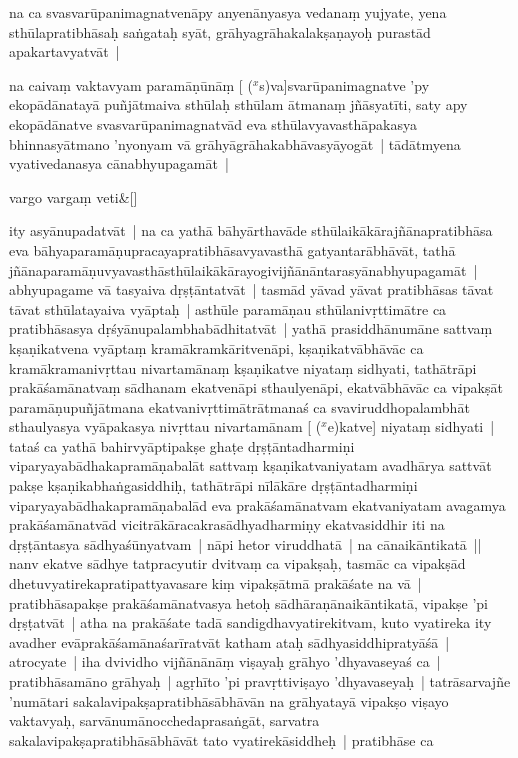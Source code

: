 \documentclass[article,a4paper]{memoir}
\newcommand{\corr}[1]{($^{x}$#1)}
\begin{document}
	  \pstart na ca svasvarū\-panimagnatvenā\-py anyenā\-nyasya vedanaṃ yujyate, yena sthū\-lapratibhā\-saḥ saṅgataḥ syā\-t, grā\-hyagrā\-hakalakṣaṇayoḥ purastā\-d apakartavyatvā\-t |
	\pend
      

	  \pstart na caivaṃ vaktavyam paramā\-ṇū\-nā\-ṃ [ {\corr sva}]svarū\-panimagnatve 'py ekopā\-dā\-natayā\- puñjā\-tmaiva sthū\-laḥ sthū\-lam ā\-tmanaṃ jñā\-syatī\-ti, saty apy ekopā\-dā\-natve svasvarū\-panimagnatvā\-d eva sthū\-lavyavasthā\-pakasya bhinnasyā\-tmano 'nyonyam vā\- grā\-hyā\-grā\-hakabhā\-vasyā\-yogā\-t | tā\-dā\-tmyena vyativedanasya cā\-nabhyupagamā\-t |
	\pend
      
	    
	    \stanza[\smallbreak]
vargo vargaṃ veti\&[\smallbreak]


	

	  \pstart ity asyā\-nupadatvā\-t | na ca yathā\- bā\-hyā\-rthavā\-de sthū\-laikā\-kā\-rajñā\-napratibhā\-sa eva bā\-hyaparamā\-ṇupracayapratibhā\-savyavasthā\- gatyantarā\-bhā\-vā\-t, tathā\- jñā\-naparamā\-ṇuvyavasthā\-[ {\corr 〔nne〕}]sthū\-laikā\-kā\-rayogivijñā\-nā\-ntarasyā\-nabhyupagamā\-t | abhyupagame vā\- tasyaiva dṛṣṭā\-ntatvā\-t | tasmā\-d yā\-vad yā\-vat pratibhā\-sas tā\-vat tā\-vat sthū\-latayaiva vyā\-ptaḥ | asthū\-le paramā\-ṇau sthū\-lanivṛttimā\-tre ca pratibhā\-sasya dṛśyā\-nupalambhabā\-dhitatvā\-t | yathā\- prasiddhā\-numā\-ne sattvaṃ kṣaṇikatvena vyā\-ptaṃ kramā\-kramkā\-ritvenā\-pi, kṣaṇikatvā\-bhā\-vā\-c ca kramā\-kramanivṛttau nivartamā\-naṃ kṣaṇikatve niyataṃ sidhyati, tathā\-trā\-pi prakā\-śamā\-natvaṃ sā\-dhanam ekatvenā\-pi sthaulyenā\-pi, ekatvā\-bhā\-vā\-c ca vipakṣā\-t paramā\-ṇupuñjā\-tmana ekatvanivṛttimā\-trā\-tmanaś ca svaviruddhopalambhā\-t sthaulyasya vyā\-pakasya nivṛttau nivartamā\-nam [ {\corr ekatve}] niyataṃ sidhyati | tataś ca yathā\- bahirvyā\-ptipakṣe ghaṭe dṛṣṭā\-ntadharmiṇi viparyayabā\-dhakapramā\-ṇabalā\-t sattvaṃ kṣaṇikatvaniyatam avadhā\-rya sattvā\-t pakṣe kṣaṇikabhaṅgasiddhiḥ, tathā\-trā\-pi nī\-lā\-kā\-re dṛṣṭā\-ntadharmiṇi viparyayabā\-dhakapramā\-ṇabalā\-d eva prakā\-śamā\-natvam ekatvaniyatam avagamya prakā\-śamā\-natvā\-d vicitrā\-kā\-racakrasā\-dhyadharmiṇy ekatvasiddhir iti na dṛṣṭā\-ntasya sā\-dhyaśū\-nyatvam | nā\-pi hetor viruddhatā\- | na cā\-naikā\-ntikatā\- || \label{thakur75-130.33} nanv ekatve sā\-dhye tatpracyutir dvitvaṃ ca vipakṣaḥ, tasmā\-c ca vipakṣā\-d dhetuvyatirekapratipattyavasare kiṃ vipakṣā\-tmā\- prakā\-śate na vā\- | pratibhā\-sapakṣe prakā\-śamā\-natvasya hetoḥ sā\-dhā\-raṇā\-naikā\-ntikatā\-, vipakṣe 'pi dṛṣṭatvā\-t | atha na prakā\-śate tadā\- sandigdhavyatirekitvam, kuto vyatireka ity avadher evā\-prakā\-śamā\-naśarī\-ratvā\-t katham ataḥ sā\-dhyasiddhipratyā\-śā\- | \label{thakur75-131.4} atrocyate | iha dvividho vijñā\-nā\-nā\-ṃ viṣayaḥ grā\-hyo 'dhyavaseyaś ca | pratibhā\-samā\-no grā\-hyaḥ | agṛhī\-to 'pi pravṛttiviṣayo 'dhyavaseyaḥ | tatrā\-sarvajñe 'numā\-tari sakalavipakṣapratibhā\-sā\-bhā\-vā\-n na grā\-hyatayā\- vipakṣo viṣayo vaktavyaḥ, sarvā\-numā\-nocchedaprasaṅgā\-t, sarvatra sakalavipakṣapratibhā\-sā\-bhā\-vā\-t tato vyatirekā\-siddheḥ | pratibhā\-se ca 
\end{document}
